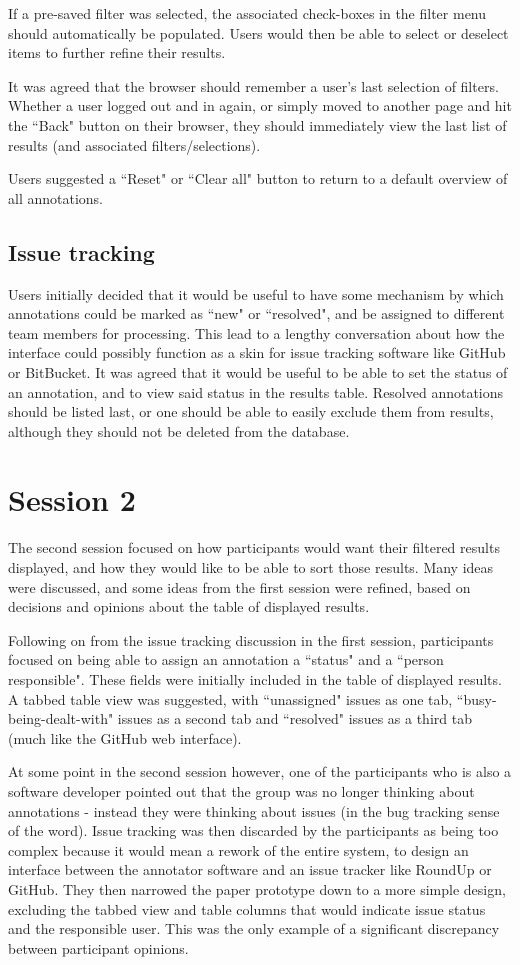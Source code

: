 If a pre-saved filter was selected, the associated check-boxes in the filter menu should automatically be populated. Users would then be able to select or deselect items to further refine their results.

It was agreed that the browser should remember a user's last selection of filters. Whether a user logged out and in again, or simply moved to another page and hit the ``Back" button on their browser, they should immediately view the last list of results (and associated filters/selections).

Users suggested a ``Reset" or ``Clear all" button to return to a default overview of all annotations. 

\subsection{Issue tracking}
Users initially decided that it would be useful to have some mechanism by which annotations could be marked as ``new" or ``resolved", and be assigned to different team members for processing. This lead to a lengthy conversation about how the interface could possibly function as a skin for issue tracking software like GitHub or BitBucket. It was agreed that it would be useful to be able to set the status of an annotation, and to view said status in the results table. Resolved annotations should be listed last, or one should be able to easily exclude them from results, although they should not be deleted from the database.

\section{Session 2}
The second session focused on how participants would want their filtered results displayed, and how they would like to be able to sort those results. Many ideas were discussed, and some ideas from the first session were refined, based on decisions and opinions about the table of displayed results. 

Following on from the issue tracking discussion in the first session, participants focused on being able to assign an annotation a ``status" and a ``person responsible". These fields were initially included in the table of displayed results. A tabbed table view was suggested, with ``unassigned" issues as one tab, ``busy-being-dealt-with" issues as a second tab and ``resolved" issues as a third tab (much like the GitHub web interface). 

At some point in the second session however, one of the participants who is also a software developer pointed out that the group was no longer thinking about annotations - instead they were thinking about issues (in the bug tracking sense of the word). Issue tracking was then discarded by the participants as being too complex because it would mean a rework of the entire system, to design an interface between the annotator software and an issue tracker like RoundUp or GitHub. They then narrowed the paper prototype down to a more simple design, excluding the tabbed view and table columns that would indicate issue status and the responsible user. This was the only example of a significant discrepancy between participant opinions. 

